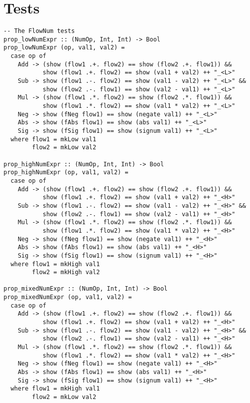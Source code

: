 \chapter{Tests}
\label{app:tests}
\begin{verbatim}
-- The FlowNum tests
prop_lowNumExpr :: (NumOp, Int, Int) -> Bool
prop_lowNumExpr (op, val1, val2) =
  case op of
    Add -> (show (flow1 .+. flow2) == show (flow2 .+. flow1)) &&
           show (flow1 .+. flow2) == show (val1 + val2) ++ "_<L>"
    Sub -> show (flow1 .-. flow2) == show (val1 - val2) ++ "_<L>" &&
           show (flow2 .-. flow1) == show (val2 - val1) ++ "_<L>"
    Mul -> (show (flow1 .*. flow2) == show (flow2 .*. flow1)) &&
           show (flow1 .*. flow2) == show (val1 * val2) ++ "_<L>"
    Neg -> show (fNeg flow1) == show (negate val1) ++ "_<L>"
    Abs -> show (fAbs flow1) == show (abs val1) ++ "_<L>"
    Sig -> show (fSig flow1) == show (signum val1) ++ "_<L>"
  where flow1 = mkLow val1
        flow2 = mkLow val2

prop_highNumExpr :: (NumOp, Int, Int) -> Bool
prop_highNumExpr (op, val1, val2) =
  case op of
    Add -> (show (flow1 .+. flow2) == show (flow2 .+. flow1)) &&
           show (flow1 .+. flow2) == show (val1 + val2) ++ "_<H>"
    Sub -> show (flow1 .-. flow2) == show (val1 - val2) ++ "_<H>" &&
           show (flow2 .-. flow1) == show (val2 - val1) ++ "_<H>"
    Mul -> (show (flow1 .*. flow2) == show (flow2 .*. flow1)) &&
           show (flow1 .*. flow2) == show (val1 * val2) ++ "_<H>"
    Neg -> show (fNeg flow1) == show (negate val1) ++ "_<H>"
    Abs -> show (fAbs flow1) == show (abs val1) ++ "_<H>"
    Sig -> show (fSig flow1) == show (signum val1) ++ "_<H>"
  where flow1 = mkHigh val1
        flow2 = mkHigh val2

prop_mixedNumExpr :: (NumOp, Int, Int) -> Bool
prop_mixedNumExpr (op, val1, val2) =
  case op of
    Add -> (show (flow1 .+. flow2) == show (flow2 .+. flow1)) &&
           show (flow1 .+. flow2) == show (val1 + val2) ++ "_<H>"
    Sub -> show (flow1 .-. flow2) == show (val1 - val2) ++ "_<H>" &&
           show (flow2 .-. flow1) == show (val2 - val1) ++ "_<H>"
    Mul -> (show (flow1 .*. flow2) == show (flow2 .*. flow1)) &&
           show (flow1 .*. flow2) == show (val1 * val2) ++ "_<H>"
    Neg -> show (fNeg flow1) == show (negate val1) ++ "_<H>"
    Abs -> show (fAbs flow1) == show (abs val1) ++ "_<H>"
    Sig -> show (fSig flow1) == show (signum val1) ++ "_<H>"
  where flow1 = mkHigh val1
        flow2 = mkLow val2
\end{verbatim}
